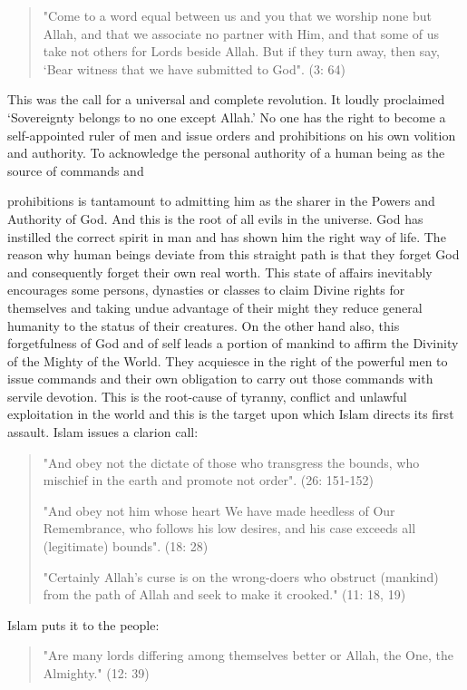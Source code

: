 \begin{quote}
"Come to a word equal between us and you that we worship none but Allah,
and that we associate no partner with Him, and that some of us take not
others for Lords beside Allah. But if they turn away, then say, `Bear
witness that we have submitted to God". (3: 64)
\end{quote}

This was the call for a universal and complete revolution. It loudly
proclaimed `Sovereignty belongs to no one except Allah.' No one has the
right to become a self-appointed ruler of men and issue orders and
prohibitions on his own volition and authority. To acknowledge the
personal authority of a human being as the source of commands and

prohibitions is tantamount to admitting him as the sharer in the Powers
and Authority of God. And this is the root of all evils in the universe.
God has instilled the correct spirit in man and has shown him the right
way of life. The reason why human beings deviate from this straight path
is that they forget God and consequently forget their own real worth.
This state of affairs inevitably encourages some persons, dynasties or
classes to claim Divine rights for themselves and taking undue advantage
of their might they reduce general humanity to the status of their
creatures. On the other hand also, this forgetfulness of God and of self
leads a portion of mankind to affirm the Divinity of the Mighty of the
World. They acquiesce in the right of the powerful men to issue commands
and their own obligation to carry out those commands with servile
devotion. This is the root-cause of tyranny, conflict and unlawful
exploitation in the world and this is the target upon which Islam
directs its first assault. Islam issues a clarion call:

\begin{quote}
"And obey not the dictate of those who transgress the bounds, who
mischief in the earth and promote not order". (26: 151-152)

"And obey not him whose heart We have made heedless of Our Remembrance,
who follows his low desires, and his case exceeds all (legitimate)
bounds". (18: 28)

"Certainly Allah's curse is on the wrong-doers who obstruct (mankind)
from the path of Allah and seek to make it crooked." (11: 18, 19)
\end{quote}

Islam puts it to the people:

\begin{quote}
"Are many lords differing among themselves better or Allah, the One, the
Almighty." (12: 39)
\end{quote}

